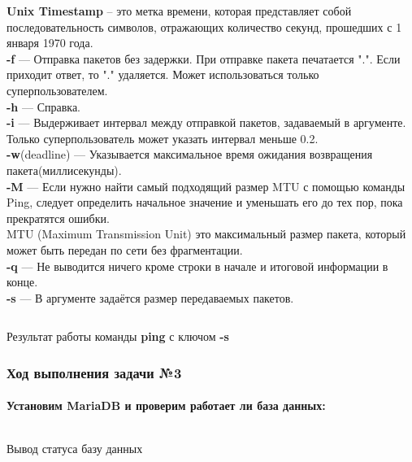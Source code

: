 \textbf{Unix Timestamp} – это метка времени, которая представляет собой последовательность символов, отражающих количество секунд, прошедших с 1 января 1970 года.\\ 
\textbf{-f} — Отправка пакетов без задержки. При отправке пакета печатается ".". Если приходит ответ, то "." удаляется. Может использоваться только суперпользователем.\\
\textbf{-h} — Справка.\\
\textbf{-i} — Выдерживает интервал между отправкой пакетов, задаваемый в аргументе. Только суперпользователь может указать интервал меньше 0.2.\\
\textbf{-w}(deadline) — Указывается максимальное время ожидания возвращения пакета(миллисекунды).\\
\textbf{-M} — Если нужно найти самый подходящий размер MTU с помощью команды Ping, следует определить начальное значение и уменьшать его до тех пор, пока прекратятся ошибки.\\ 
MTU (Maximum Transmission Unit) это максимальный размер пакета, который может быть передан по сети без фрагментации.\\
\textbf{-q} — Не выводится ничего кроме строки в начале и итоговой информации в конце.\\ 
\textbf{-s} — В аргументе задаётся размер передаваемых пакетов.

\begin{code}
	\inputminted[breaklines=true, xleftmargin=1em, linenos, frame=single, framesep=10pt, fontsize=\footnotesize, firstline=1, lastline=33]{haskell}{fig/ping-s.bash}
	\caption{Результат работы команды \textbf{ping} с ключом \textbf{-s}}
\end{code}

\subsubsection{Ход выполнения задачи №3}

\paragraph{Установим MariaDB и проверим работает ли база данных:}

\begin{code}
	\inputminted[breaklines=true, xleftmargin=1em, linenos, frame=single, framesep=10pt, fontsize=\footnotesize, firstline=1, lastline=33]{haskell}{fig/mariadb.bash}
	\caption{Вывод статуса базу данных}
\end{code}

